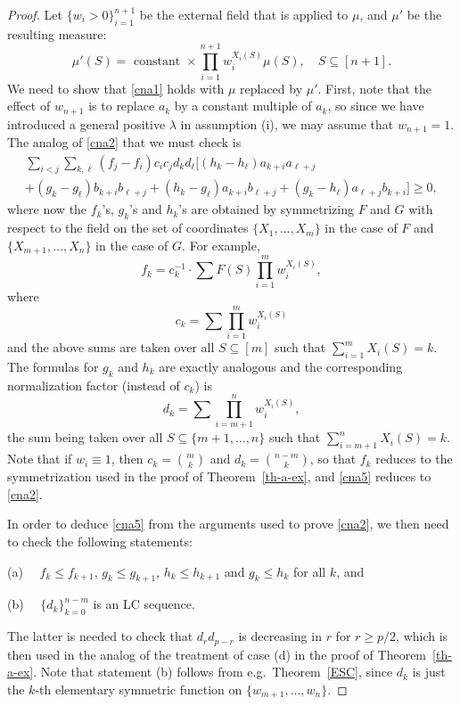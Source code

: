 \documentclass[10pt,reqno]{amsart}
\theoremstyle{plain}
\theoremstyle{definition}
\theoremstyle{remark}
\begin{document}
\begin{proof}
Let $\{w_i>0\}_{i=1}^{n+1}$ be the external field that is  applied to $\mu$, 
and
$\mu'$ be the resulting measure:
$$\mu'(S)=\text{ constant }\times\prod_{i=1}^{n+1}w_i^{X_i(S)}\mu(S), \quad 
S\subseteq [n+1].$$
We need to show that \eqref{cna1} holds with $\mu$ replaced by $\mu'$. 
First,  note that the effect
of $w_{n+1}$ is to replace $a_k$ by a constant multiple of $a_k$, so  
since we have introduced a general
positive $\lambda$ in assumption (i), we may assume that $w_{n+1}=1.$  
The analog of \eqref{cna2} that we must check is
\begin{multline}\label{cna5}
\sum_{i<j}\sum_{k,\ell}(f_j-f_i)c_ic_jd_kd_\ell
\bigg[(h_k-h_\ell)a_ {k+i}a_{\ell+j}\\+
(g_k-g_\ell)b_{k+i}b_{\ell+j}+(h_k-g_\ell)a_{k+i}b_{\ell+j} 
+(g_k-h_\ell)a_{\ell+j}b_{k +i}\bigg]\geq 0,
\end{multline}
where now the $f_k$'s, $g_k$'s and $h_k$'s are obtained by  symmetrizing $F$ 
and $G$ with respect to the
field on the set of coordinates $\{X_1,\ldots,X_m\}$ in the case of $F$  
and $\{X_{m+1},\ldots,X_n\}$
in the case of $G$. For example,
$$f_k=c_k^{-1}\cdot\sum F(S)\prod_{i=1}^mw_i^{X_i(S)},$$
where 
$$c_k=\sum \prod_{i=1}^mw_i^{X_i(S)}$$
and the above sums are taken over all $S\subseteq [m]$ such that 
$\sum_{i=1} ^mX_i(S)=k$. The formulas for $g_k$ and $h_k$ are exactly 
analogous and the corresponding normalization factor (instead of $c_k$) is
$$d_k=\sum \prod_{i=m+1}^{n}w_{i}^{X_i(S)},$$
the sum being taken over all $S\subseteq \{m+1,\ldots,n\}$ such that 
$\sum_{i=m+1}^{n}X_i(S)=k$. 
Note that if $w_i\equiv 1$, then $c_k=\binom mk$ and $d_k=\binom{n-m} {k}$, 
so that $f_k$ reduces to the symmetrization used in the proof of 
Theorem~\ref{th-a-ex}, and \eqref{cna5} reduces
to \eqref{cna2}.

In order to deduce \eqref{cna5} from the arguments used to prove \eqref{cna2},
we then  need to check the following statements:

\medskip

(a) $\quad f_k\le f_{k+1}$, $g_k\le g_{k+1}$, $h_k\le h_{k+1}$ and
$g_k\leq h_k$ for all $k$, and

(b) $\quad \{d_k\}_{k=0}^{n-m}$ is an LC sequence.

\medskip

\noindent The latter is needed to check that
$d_rd_{p-r}$
is decreasing in $r$ for $r\geq p/2$, which is then used in the analog  
of the treatment of case (d) in the proof of Theorem~\ref{th-a-ex}. Note that 
statement (b) follows from e.g.~Theorem~\ref{ESC}, since $d_k$ is just the
$k$-th elementary symmetric function on $\{w_{m+1},\ldots,w_n\}$.
 

\end{proof}
\end{document}
